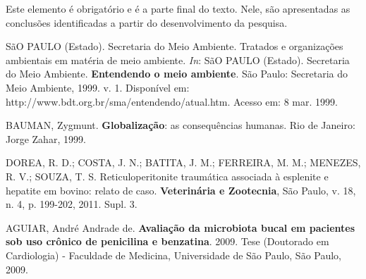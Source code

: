 \documentclass[
  oneside, %
  english,
  brazil
]{abntbibufjf}
\begin{document}
Este elemento é obrigatório e é a parte final do texto.  Nele, são apresentadas as conclusões identificadas a partir do desenvolvimento da pesquisa.



\postextual





\begin{thebibliography}{99}




   SãO PAULO (Estado). Secretaria do Meio Ambiente. Tratados e organizações ambientais em matéria de meio ambiente. \textit{In}: SãO
  PAULO (Estado). Secretaria do Meio Ambiente. \textbf{Entendendo o meio ambiente}. São Paulo: Secretaria do Meio Ambiente, 1999. v. 1. Disponível em:
  http://www.bdt.org.br/sma/entendendo/atual.htm. Acesso em: 8 mar. 1999.


   BAUMAN, Zygmunt. \textbf{Globalização}: as consequências humanas. Rio de Janeiro: Jorge Zahar, 1999.


   DOREA, R. D.; COSTA, J. N.; BATITA, J. M.; FERREIRA, M. M.; MENEZES, R. V.; SOUZA, T. S. Reticuloperitonite traumática associada à esplenite
  e hepatite em bovino: relato de caso. \textbf{Veterinária e Zootecnia}, São Paulo, v. 18, n. 4, p. 199-202, 2011. Supl. 3.


   AGUIAR, André Andrade de. \textbf{Avaliação da microbiota bucal em pacientes sob uso crônico de penicilina e benzatina}. 2009.
  Tese (Doutorado em Cardiologia) - Faculdade de Medicina, Universidade de São Paulo, São Paulo, 2009.


\end{thebibliography}
\end{document}
